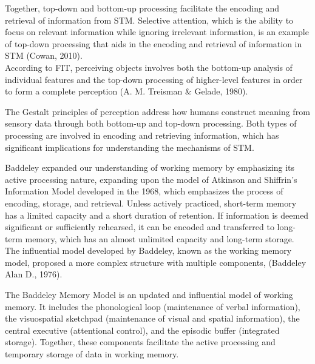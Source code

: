 \documentclass[print]{nuthesis}
\begin{document}
Together, top-down and bottom-up processing facilitate the encoding and retrieval of information from STM.
Selective attention, which is the ability to focus on relevant information while ignoring irrelevant information, is an example of top-down processing that aids in the encoding and retrieval of information in STM (Cowan, 2010).\\
According to FIT, perceiving objects involves both the bottom-up analysis of individual features and the top-down processing of higher-level features in order to form a complete perception (A. M. Treisman \& Gelade, 1980).

The Gestalt principles of perception address how humans construct meaning from sensory data through both bottom-up and top-down processing.
Both types of processing are involved in encoding and retrieving information, which has significant implications for understanding the mechanisms of STM.

Baddeley expanded our understanding of working memory by emphasizing its active processing nature, expanding upon the model of Atkinson and Shiffrin's Information Model developed in the 1968, which emphasizes the process of encoding, storage, and retrieval.
Unless actively practiced, short-term memory has a limited capacity and a short duration of retention.
If information is deemed significant or sufficiently rehearsed, it can be encoded and transferred to long-term memory, which has an almost unlimited capacity and long-term storage.
The influential model developed by Baddeley, known as the working memory model, proposed a more complex structure with multiple components, (Baddeley Alan D., 1976).

The Baddeley Memory Model is an updated and influential model of working memory.
It includes the phonological loop (maintenance of verbal information), the visuospatial sketchpad (maintenance of visual and spatial information), the central executive (attentional control), and the episodic buffer (integrated storage).
Together, these components facilitate the active processing and temporary storage of data in working memory.
\end{document}
